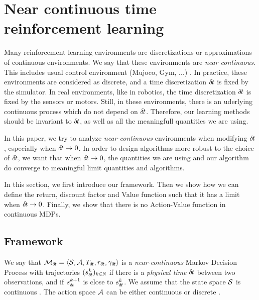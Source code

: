 \section{Near continuous time reinforcement learning}
\label{sec:framework}


Many reinforcement learning environments are discretizations or approximations of continuous environments. We say that these environments are \emph{near continuous}. This includes usual control environment (Mujoco, Gym, ...) . In practice, these environments are considered as discrete, and a time discretization ${\delta\hspace{-.1em}t}$ is fixed by the simulator. In real environments, like in robotics, the time discretization ${\delta\hspace{-.1em}t}$ is fixed by the sensors or motors. Still, in these environments, there is an uderlying continuous process which do not depend on ${\delta\hspace{-.1em}t}$. Therefore, our learning methods should be invariant to ${\delta\hspace{-.1em}t}$, as well as all the meaningfull quantities we are using.

In this paper, we try to analyze \emph{near-continuous} environments when  modifying ${\delta\hspace{-.1em}t}$, especially when ${\delta\hspace{-.1em}t} \rightarrow 0$. In order to design algorithms more robust to the choice of ${\delta\hspace{-.1em}t}$, we want that when ${\delta\hspace{-.1em}t} \rightarrow 0$, the quantities we are using and our algorithm do converge to meaningful limit quantities and algorithms.


In this section, we first introduce our framework. Then we show how we can define the return, discount factor and Value function such that it has a limit when ${\delta\hspace{-.1em}t} \rightarrow 0$. Finally, we show that there is no Action-Value function in continuous MDPs.

\subsection{Framework}

We say that ${\cal M}_{\delta\hspace{-.1em}t} = \langle {\cal S}, {\cal A}, T_{{\delta\hspace{-.1em}t}}, r_{\delta\hspace{-.1em}t}, \gamma_{\delta\hspace{-.1em}t}\rangle$ is a \emph{near-continuous} Markov Decision Process with trajectories $(s_{\delta\hspace{-.1em}t}^k)_{k\in\mathbb{N}}$ if there is a \emph{physical time} ${\delta\hspace{-.1em}t}$ between two observations, and if $s_{\delta\hspace{-.1em}t}^{k+1}$ is close to $s_{\delta\hspace{-.1em}t}^k$. We assume that the state space ${\cal S}$ is continuous . The action space ${\cal A}$ can be either continuous or discrete .

